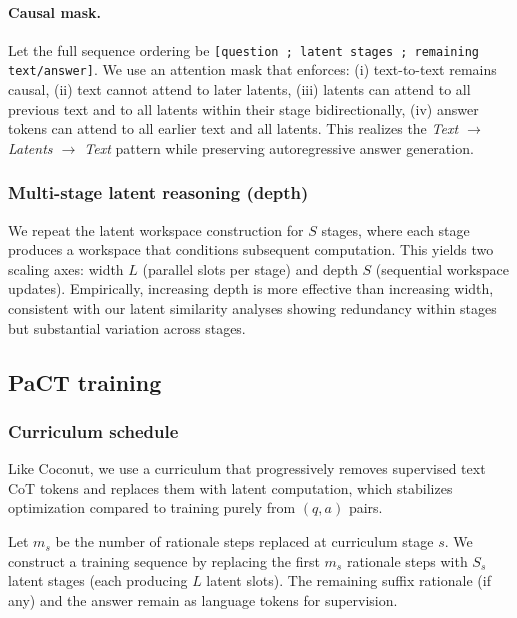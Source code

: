\paragraph{Causal mask.}
Let the full sequence ordering be \texttt{[question ; latent stages ; remaining text/answer]}.
We use an attention mask that enforces:
(i) text-to-text remains causal,
(ii) text cannot attend to later latents,
(iii) latents can attend to all previous text and to all latents within their stage bidirectionally,
(iv) answer tokens can attend to all earlier text and all latents.
This realizes the \textit{Text $\rightarrow$ Latents $\rightarrow$ Text} pattern while preserving autoregressive
answer generation. 


\subsubsection{Multi-stage latent reasoning (depth)}
\label{sec:stages}

We repeat the latent workspace construction for $S$ stages, where each stage produces a workspace that conditions subsequent computation. This yields two scaling axes: width $L$ (parallel slots per stage) and depth $S$ (sequential workspace updates). Empirically, increasing depth is more effective than increasing width, consistent with our latent similarity analyses showing redundancy within stages but substantial variation across stages.




\subsection{PaCT training}
\label{sec:training}

\subsubsection{Curriculum schedule}
\label{sec:curriculum}

Like Coconut, we use a curriculum that progressively removes supervised text CoT tokens and
replaces them with latent computation, which stabilizes optimization compared to training purely
from $(q,a)$ pairs. 

Let $m_s$ be the number of rationale steps replaced at curriculum stage $s$.
We construct a training sequence by replacing the first $m_s$ rationale steps with $S_s$ latent stages
(each producing $L$ latent slots). The remaining suffix rationale (if any) and the answer remain as
language tokens for supervision.

